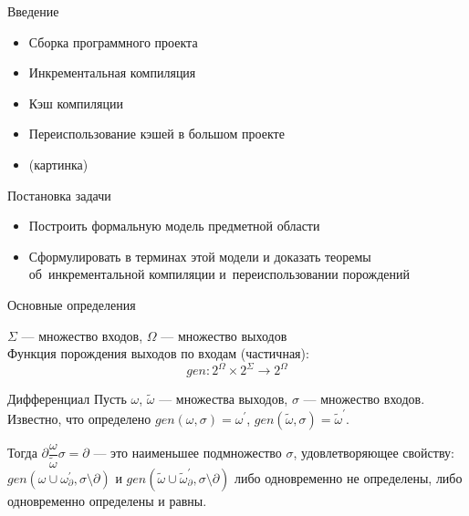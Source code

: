 


% 



{
	\begin{frame}
		\titlepage
	\end{frame}
}
\addtocounter{framenumber}{-1}

\begin{frame}{Введение}
\begin{itemize}
	\item Сборка программного проекта
	\item Инкрементальная компиляция
	\item Кэш компиляции
	\item Переиспользование кэшей в большом проекте
	\item (картинка)
\end{itemize}
\end{frame}

\begin{frame}{Постановка задачи}
\begin{itemize}
	\item Построить формальную модель предметной области
	\item Сформулировать в терминах этой модели и доказать теоремы об~инкрементальной компиляции и~переиспользовании порождений
\end{itemize}
\end{frame}

\begin{frame}{Основные определения}

$\Sigma$ --- множество входов, $\Omega$ --- множество выходов\\
Функция порождения выходов по входам (частичная):
$$gen : 2^\Omega \times 2^\Sigma \to 2^\Omega$$

\end{frame}

\begin{frame}{Дифференциал}
Пусть $\omega$, $\tilde{\omega}$ --- множества выходов, $\sigma$ --- множество входов. Известно, что определено $gen(\omega, \sigma) = \omega^\prime$, $gen(\tilde{\omega}, \sigma) = \tilde{\omega}^\prime$.

Тогда $\partial\dfrac{\omega}{\tilde{\omega}}\sigma = \partial$ --- это наименьшее подмножество $\sigma$, удовлетворяющее свойству: 
$gen(\omega \cup \omega^\prime_{\partial}, \sigma\setminus\partial)$ и
$gen(\tilde{\omega} \cup \tilde{\omega}^\prime_{\partial}, \sigma\setminus\partial)$ либо одновременно не определены, либо одновременно определены и равны. 
\end{frame}

